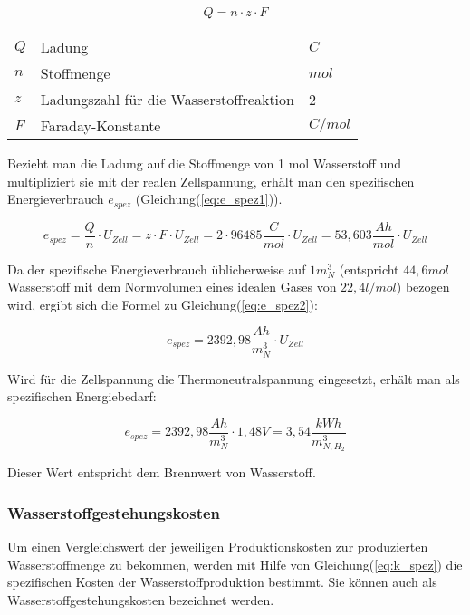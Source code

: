 \documentclass[onecolumn,10pt,titlepage]{article}
\begin{document}
		\begin{equation}
		\label{eq:Q}
		Q=n\cdot z \cdot F
		\end{equation}

		\begin{table}[H]
			\begin{tabular*}{\textwidth}{lll}
				$Q$&Ladung&$C$\\
				$n$&Stoffmenge&$mol$\\
				$z$&Ladungszahl für die Wasserstoffreaktion & 2\\
				$F$&Faraday-Konstante&$C/mol$
			\end{tabular*}
		\end{table}

		Bezieht man die Ladung auf die Stoffmenge von 1 mol Wasserstoff und multipliziert sie mit der realen Zellspannung, erhält man den spezifischen Energieverbrauch $e_{spez}$ (Gleichung(\ref{eq:e_spez1})).\cite{Bayer.2000}

		\begin{equation}
		\label{eq:e_spez1}
		e_{spez} = \frac{Q}{n}\cdot U_{Zell}=z\cdot F\cdot U_{Zell}=2\cdot 96485 \frac{C}{mol}\cdot U_{Zell} = 53,603 \dfrac{Ah}{mol}\cdot U_{Zell}
		\end{equation}

			Da der spezifische Energieverbrauch üblicherweise auf $1 m^3_N$ (entspricht $44,6 mol$ Wasserstoff mit dem Normvolumen eines idealen Gases von $22,4 l/mol$) bezogen wird, ergibt sich die Formel zu Gleichung(\ref{eq:e_spez2}):

			\begin{equation}
			\label{eq:e_spez2}
			e_{spez} = 2392,98\frac{Ah}{m^3_N}\cdot U_{Zell}
			\end{equation}

			Wird für die Zellspannung die Thermoneutralspannung eingesetzt, erhält man als spezifischen Energiebedarf:

			\begin{equation}
			\label{eq:e_spez3}
			e_{spez} = 2392,98\frac{Ah}{m^3_N}\cdot 1,48V=3,54\frac{kWh}{m^3_{N,H_2}}
			\end{equation}

			Dieser Wert entspricht dem Brennwert von Wasserstoff.

			\subsubsection*{Wasserstoffgestehungskosten}
			Um einen Vergleichswert der jeweiligen Produktionskosten zur produzierten Wasserstoffmenge zu bekommen, werden mit Hilfe von Gleichung(\ref{eq:k_spez}) die spezifischen Kosten der Wasserstoffproduktion bestimmt. Sie können auch als Wasserstoffgestehungskosten bezeichnet werden.
\end{document}

